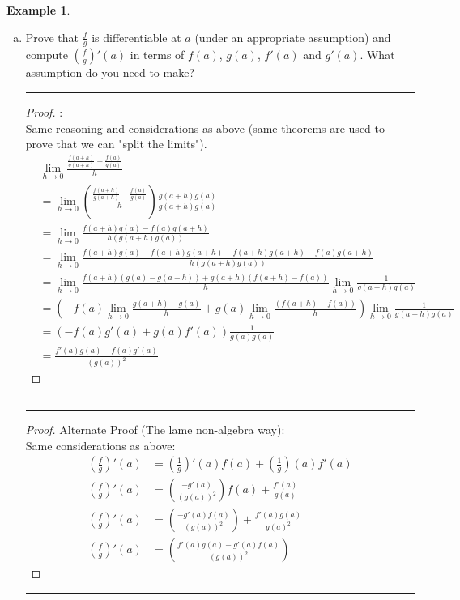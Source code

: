 \documentclass[openany, amssymb, psamsfonts]{amsart}
\theoremstyle{definition}
\newtheorem{exmp}{Example}[section]
\numberwithin{equation}{section}
\begin{document}
\begin{exmp}
\begin{enumerate}[(a)]
		\item Prove that $\frac{f}{g}$ is differentiable at $a$ (under an appropriate assumption) and compute $(\frac{f}{g})'(a)$ in terms of $f(a)$, $g(a)$, $f'(a)$ and $g'(a)$. What assumption do you need to make?
\vspace{4pt}     \hrule   \vspace{4pt}  \begin{proof}:\\
Same reasoning and considerations as above (same theorems are used to prove that we can "split the limits").
\begin{align*}
&\lim\limits_{h\to 0}\frac{\frac{f(a+h)}{g(a+h)} - \frac{f(a)}{g(a)}}{h}\\
&= \lim\limits_{h\to 0}(\frac{\frac{f(a+h)}{g(a+h)} - \frac{f(a)}{g(a)}}{h})\frac{g(a+h)g(a)}{g(a+h)g(a)}\\
&= \lim\limits_{h\to 0}\frac{f(a+h)g(a) - f(a)g(a+h)}{h(g(a+h)g(a))}\\
&= \lim\limits_{h\to 0}\frac{f(a+h)g(a) - f(a+h)g(a+h) + f(a+h)g(a+h)-f(a)g(a+h)}{h(g(a+h)g(a))}\\
&= \lim\limits_{h\to 0}\frac{f(a+h)(g(a) - g(a+h)) + g(a+h)(f(a+h)-f(a))}{h} \lim\limits_{h\to 0}\frac{1}{g(a+h)g(a)}\\
&= (-f(a)\lim\limits_{h\to 0}\frac{g(a+h) - g(a)}{h} + g(a)\lim\limits_{h\to 0}\frac{(f(a+h)-f(a))}{h}) \lim\limits_{h\to 0}\frac{1}{g(a+h)g(a)}\\
&= (-f(a)g'(a) + g(a)f'(a)) \frac{1}{g(a)g(a)}\\
&= \frac{f'(a)g(a) - f(a)g'(a)}{(g(a))^2}
\end{align*}
\end{proof}\vspace{4pt}     \hrule   \vspace{4pt}
\vspace{4pt}     \hrule   \vspace{4pt}  \begin{proof}
Alternate Proof (The lame non-algebra way):\\ Same considerations as above:
\begin{align*}
(\frac{f}{g})'(a) &= (\frac{1}{g})'(a)f(a) + (\frac{1}{g})(a)f'(a)\\
(\frac{f}{g})'(a) &=  (\frac{-g'(a)}{(g(a))^2})f(a) + \frac{f'(a)}{g(a)}\\
(\frac{f}{g})'(a) &=  (\frac{-g'(a)f(a)}{(g(a))^2}) + \frac{f'(a)g(a)}{g(a)^2}\\
(\frac{f}{g})'(a) &=  (\frac{f'(a)g(a)-g'(a)f(a)}{(g(a))^2})
\end{align*}
\end{proof}\vspace{4pt}     \hrule   \vspace{4pt}
	\end{enumerate}
\end{exmp}
\end{document}
